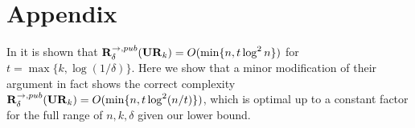 \section{Appendix}
In \cite[Proposition 1]{JowhariST11} it is shown that $\mathbf{R}^{\rightarrow,pub}_\delta(\mathbf{UR}_k) = O(\min\{n,t\log^2 n\})$ for $t = \max\{k,\log(1/\delta)\}$. Here we show that a minor modification of their argument in fact shows the correct complexity $\mathbf{R}^{\rightarrow,pub}_\delta(\mathbf{UR}_k) = O(\min\{n,t\log^2(n/t)\})$, which is optimal up to a constant factor for the full range of $n,k,\delta$ given our lower bound.
